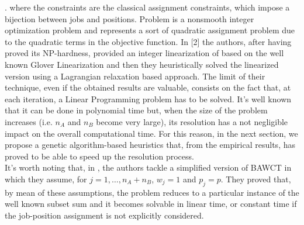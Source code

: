 \documentclass[opre,nonblindrev]{informs3} %
\begin{document}
\ea
\right.
\ee
where the constraints are the classical assignment constraints, which impose a bijection between jobs and positions. 
Problem  is a nonsmooth integer optimization problem and represents a sort of quadratic assignment problem due to the quadratic terms in the objective function. In [2] the authors, after having proved its NP-hardness, provided an integer linearization of  based on the well known Glover Linearization and then they heuristically solved the linearized version using a Lagrangian relaxation based approach. The limit of their technique, even if the obtained results are valuable, consists on the fact that, at each iteration, a Linear Programming problem has to be solved. It's well known that it can be done in polynomial time but, when the size of the problem increases (i.e. $n_A$ and $n_B$ become very large), its resolution has a not negligible impact on the overall computational time. For this reason, in the next section, we propose a genetic algorithm-based heuristics that, from the empirical results, has proved to be able to speed up the resolution process.\\
It's worth noting that, in \cite{av-fud20}, the authors tackle a simplified version of BAWCT in which they assume, for $j=1,\ldots,n_A+n_B$, $w_j=1$ and $p_j=p$. They proved that, by mean of these assumptions, the problem reduces to a particular instance of the well known subset sum and it becomes solvable in linear time, or constant time if the job-position assignment is not explicitly considered.
\end{document}
